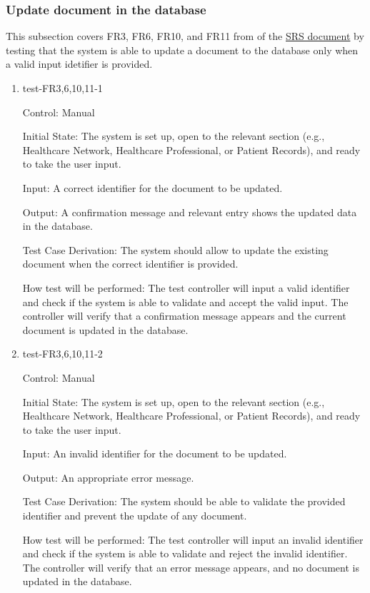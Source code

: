 \documentclass[12pt, titlepage]{article}
\begin{document}
\subsubsection{Update document in the database} \label{section:4.1.3}

This subsection covers FR3, FR6, FR10, and FR11 from of the \href{https://github.com/Inreet-Kaur/capstone/blob/main/docs/SRS/SRS.pdf}{SRS document} \citep{SRS} by testing that the system is able to update a document to the database only when a valid input idetifier is provided.

\begin{enumerate}

\item{test-FR3,6,10,11-1} \label{test-FR3,6,10,11-1}

Control: Manual

Initial State: The system is set up, open to the relevant section (e.g., Healthcare Network, Healthcare Professional, or Patient Records), and ready to take the user input.

Input: A correct identifier for the document to be updated.

Output: A confirmation message and relevant entry shows the updated data in the database.

Test Case Derivation: The system should allow to update the existing document when the correct identifier is provided.

How test will be performed: The test controller will input a valid identifier and check if the system is able to validate and accept the valid input. The controller will verify that a confirmation message appears and the current document is updated in the database.


\item{test-FR3,6,10,11-2} \label{test-FR3,6,10,11-2}

Control: Manual

Initial State: The system is set up, open to the relevant section (e.g., Healthcare Network, Healthcare Professional, or Patient Records), and ready to take the user input. 

Input: An invalid identifier for the document to be updated.

Output: An appropriate error message.

Test Case Derivation: The system should be able to validate the provided identifier and prevent the update of any document.

How test will be performed: The test controller will input an invalid identifier and check if the system is able to validate and reject the invalid identifier. The controller will verify that an error message appears, and no document is updated in the database. 

\end{enumerate}
\end{document}

